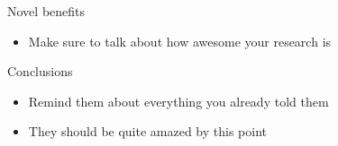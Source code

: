 \documentclass[final, usenames, dvipsnames]{beamer}
\newlength{\onecolwidth}
\begin{document}
\begin{frame}[t]
\begin{columns}[T,onlytextwidth]
\begin{column}{\onecolwidth}
\begin{block}{Novel benefits} %
	\begin{itemize}
		\item Make sure to talk about how awesome your research is
	\end{itemize}
\end{block} %

\begin{block}{Conclusions} %
	\begin{itemize}
		\item Remind them about everything you already told them
		\item They should be quite amazed by this point
	\end{itemize}
\end{block} %
\end{column}  %

\end{columns} %
\end{frame} %
\end{document}
